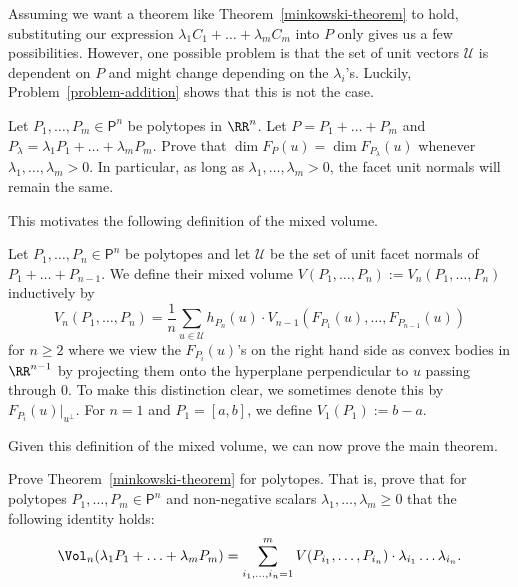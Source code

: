 \documentclass[11pt]{article}
\begin{document}
Assuming we want a theorem like Theorem~\ref{minkowski-theorem} to hold, substituting our expression $\lambda_1 C_1 + \ldots + \lambda_m C_m$ into $P$ only gives us a few possibilities. However, one possible problem is that the set of unit vectors $\mathcal{U}$ is dependent on $P$ and might change depending on the $\lambda_i$'s. Luckily, Problem~\ref{problem-addition} shows that this is not the case. 

\begin{prob} [15 points] \label{problem-addition}
    Let $P_1, \ldots, P_m \in \mathsf{P}^n$ be polytopes in $\RR^n$. Let $P = P_1 + \ldots + P_m$ and $P_\lambda = \lambda_1 P_1 + \ldots + \lambda_m P_m$. Prove that $\dim F_P(u) = \dim F_{P_\lambda}(u)$ whenever $\lambda_1, \ldots, \lambda_m > 0$. In particular, as long as $\lambda_1, \ldots, \lambda_m > 0$, the facet unit normals will remain the same.  
\end{prob}

This motivates the following definition of the mixed volume. 

\begin{defn}
    Let $P_1, \ldots, P_n \in \mathsf{P}^n$ be polytopes and let $\mathcal{U}$ be the set of unit facet normals of $P_1 + \ldots + P_{n-1}$. We define their mixed volume $V (P_1, \ldots, P_n) := V_n (P_1, \ldots, P_n)$ inductively by 
    \[
        V_n (P_1, \ldots, P_n) = \frac{1}{n} \sum_{u \in \mathcal{U}} h_{P_n} (u) \cdot V_{n-1}(F_{P_1}(u), \ldots, F_{P_{n-1}}(u))
    \]  
    for $n \geq 2$ where we view the $F_{P_i}(u)$'s on the right hand side as convex bodies in $\RR^{n-1}$ by projecting them onto the hyperplane perpendicular to $u$ passing through $0$. To make this distinction clear, we sometimes denote this by $F_{P_i}(u)|_{u^\perp}$. For $n = 1$ and $P_1 = [a, b]$, we define $V_1(P_1) := b-a$. 
\end{defn}

Given this definition of the mixed volume, we can now prove the main theorem. 

\begin{prob} [30 points]
    Prove Theorem~\ref{minkowski-theorem} for polytopes. That is, prove that for polytopes $P_1, \ldots, P_m \in \mathsf{P}^n$ and non-negative scalars $\lambda_1, \ldots, \lambda_m \geq 0$ that the following identity holds:
    \[
        \Vol_n(\lambda_1 P_1 + \ldots + \lambda_m P_m) = \sum_{i_1, \ldots, i_n = 1}^m V(P_{i_1}, \ldots, P_{i_n}) \cdot \lambda_{i_1} \ldots \lambda_{i_n}.
    \]   
\end{prob}
\end{document}
